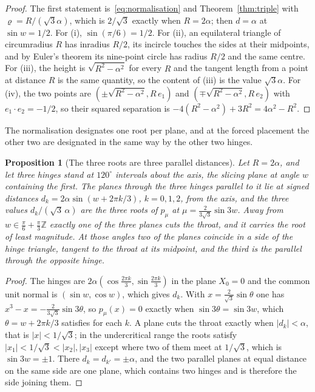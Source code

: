 \documentclass[11pt]{article}
\theoremstyle{plain}
\newtheorem{proposition}[theorem]{Proposition}
\theoremstyle{definition}
\theoremstyle{remark}
\begin{document}
\begin{proof}
The first statement is~\eqref{eq:normalisation} and Theorem~\ref{thm:triple} with $\varrho=R/(\sqrt3\alpha)$,
which is $2/\sqrt3$ exactly when $R=2\alpha$; then $d=\alpha$ at $\sin w=1/2$. For (i), $\sin(\pi/6)=1/2$. For
(ii), an equilateral triangle of circumradius $R$ has inradius $R/2$, its incircle touches the sides at their
midpoints, and by Euler's theorem its nine-point circle has radius $R/2$ and the same centre. For (iii), the
height is $\sqrt{R^{2}-\alpha^{2}}$ for every $R$ and the tangent length from a point at distance $R$ is the same
quantity, so the content of (iii) is the value $\sqrt3\alpha$. For (iv), the two points are
$(\pm\sqrt{R^{2}-\alpha^{2}},R\,e_{1})$ and $(\mp\sqrt{R^{2}-\alpha^{2}},R\,e_{2})$ with $e_{1}\cdot e_{2}=-1/2$, so their
squared separation is $-4(R^{2}-\alpha^{2})+3R^{2}=4\alpha^{2}-R^{2}$.
\end{proof}

The normalisation designates one root per plane, and at the forced placement the other two are designated in the
same way by the other two hinges.

\begin{proposition}[The three roots are three parallel distances]\label{prop:parallel}
Let $R=2\alpha$, and let three hinges stand at $120^{\circ}$ intervals about the axis, the slicing plane at angle
$w$ containing the first. The planes through the three hinges parallel to it lie at signed distances
$d_{k}=2\alpha\sin(w+2\pi k/3)$, $k=0,1,2$, from the axis, and the three values $d_{k}/(\sqrt3\,\alpha)$ are the
three roots of $p_{\mu}$ at $\mu=\tfrac{2}{3\sqrt3}\sin3w$. Away from $w\in\tfrac{\pi}{6}+\tfrac{\pi}{3}\mathbb{Z}$
exactly one of the three planes cuts the throat, and it carries the root of least magnitude. At those angles two
of the planes coincide in a side of the hinge triangle, tangent to the throat at its midpoint, and the third is the
parallel through the opposite hinge.
\end{proposition}

\begin{proof}
The hinges are $2\alpha(\cos\tfrac{2\pi k}{3},\sin\tfrac{2\pi k}{3})$ in the plane $X_{0}=0$ and the common unit
normal is $(\sin w,\cos w)$, which gives $d_{k}$. With $x=\tfrac{2}{\sqrt3}\sin\theta$ one has
$x^{3}-x=-\tfrac{2}{3\sqrt3}\sin3\theta$, so $p_{\mu}(x)=0$ exactly when $\sin3\theta=\sin3w$, which
$\theta=w+2\pi k/3$ satisfies for each $k$. A plane cuts the throat exactly when $|d_{k}|<\alpha$, that is
$|x|<1/\sqrt3$; in the undercritical range the roots satisfy $|x_{1}|<1/\sqrt3<|x_{2}|,|x_{3}|$ except where two
of them meet at $1/\sqrt3$, which is $\sin3w=\pm1$. There $d_{k}=d_{k'}=\pm\alpha$, and the two parallel planes at
equal distance on the same side are one plane, which contains two hinges and is therefore the side joining
them.
\end{proof}
\end{document}
